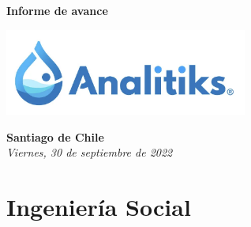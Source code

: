 \documentclass[12pt]{article}
\begin{document}
\begin{center}
    \vspace*{8cm}
    {\Huge \textbf{\sffamily Informe de avance}}\\[0.5em]
\end{center}

\begin{center}
    \includegraphics[width=8cm]{ANALITIKS.png}
\end{center}

\begin{center}
    \vspace{9cm}
    \textcolor{secondary}{\textbf{Santiago de Chile}}\\
    \textit{Viernes, 30 de septiembre de 2022}
    \vspace{1cm}
\end{center}


\newpage



\tableofcontents
\newpage

\section{Ingeniería Social}
\end{document}
